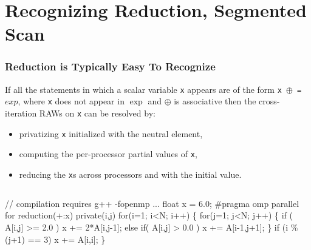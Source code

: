\documentclass{beamer}
\renewcommand{\emph}[1]{\textcolor{CosGreen}{ #1}}
\begin{document}
\section{Recognizing Reduction, Segmented Scan}
\begin{frame}[fragile,t]
  \frametitle{Reduction is Typically Easy To Recognize} 

If all the statements in which a scalar variable {\tt x} appears
are of the form {\tt x $\oplus$ = $exp$}, where {\tt x} does 
not appear in $\exp$ and $\oplus$ is associative 
then the cross-iteration RAWs on {\tt x} can be resolved by:
\begin{itemize}
    \item privatizing {\tt x} initialized with the neutral element,
    \item computing the per-processor partial values of {\tt x},
    \item reducing the {\tt x}s across processors and with the initial value.
\end  {itemize} 

\begin{columns}
\begin{colorcode}[fontsize=\scriptsize]
// compilation requires g++ -fopenmp ...
  float x = 6.0;
\#pragma omp parallel for reduction(+:x) private(i,j)
  for(i=1; i<N; i++) \{
    for(j=1; j<N; j++) \{
      if ( A[i,j] >= 2.0 )    \emph{x += 2*A[i,j-1]};
      else if( A[i,j] > 0.0 ) \emph{x += A[i-1,j+1];}
    \}
    if (i \% (j+1) == 3) \emph{x += A[i,i];}
  \}
\end{colorcode}

\end{columns}
\end{frame}
\end{document}
